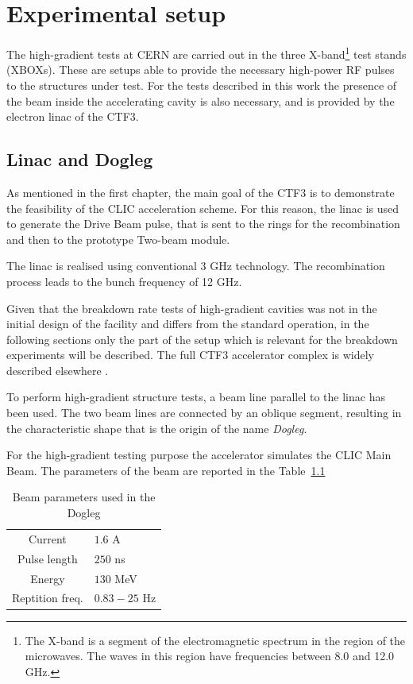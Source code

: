 \chapter[Experimental setup]{Experimental setup}
\label{chap:setup}

The high-gradient tests at CERN are carried out in the three X-band\footnote{The X-band is a segment of the electromagnetic spectrum in the region of the microwaves. The waves in this region have frequencies between 8.0 and 12.0 GHz.} test stands (XBOXs). These are setups able to provide the necessary high-power RF pulses to the structures under test. For the tests described in this work the presence of the beam inside the accelerating cavity is also necessary, and is provided by the electron linac of the CTF3. 


\section[Linac and dogleg]{Linac and Dogleg}

As mentioned in the first chapter, the main goal of the CTF3 is to demonstrate the feasibility of the CLIC acceleration scheme. For this reason, the linac is used to generate the Drive Beam pulse, that is sent to the rings for the recombination and then to the prototype Two-beam module. 

The linac is realised using conventional 3 GHz technology. The recombination process leads to the bunch frequency of 12 GHz. 

Given that the breakdown rate tests of high-gradient cavities was not in the initial design of the facility and differs from the standard operation, in the following sections only the part of the setup which is relevant for the breakdown experiments will be described. The full CTF3 accelerator complex is widely described elsewhere \cite{CLIC:cdr,CTF:drive_beam,ctf3:dr}. 

To perform high-gradient structure tests, a beam line parallel to the linac has been used. The two beam lines are connected by an oblique segment, resulting in the characteristic shape that is the origin of the name \textit{Dogleg}.

For the high-gradient testing purpose the accelerator  simulates the CLIC Main Beam. The parameters of the beam are reported in the Table~\ref{beam_par_dogleg}


\begin{table}
  \centering
    \begin{tabular}{ c l }
    \toprule
    Current 		&	$1.6$ A\\
    Pulse length		&	$250$ ns\\
    Energy			&	$130$ MeV\\
    Reptition freq.	&	$0.83-25$ Hz\\
    \bottomrule
    \end{tabular}
\caption{Beam parameters used in the Dogleg \cite{NavarroQuirante:2025954}}
\label{beam_par_dogleg}
\end{table}



